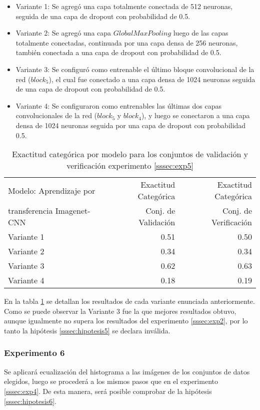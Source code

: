 \begin{itemize}
	\item Variante 1: Se agregó una capa totalmente conectada de 512 neuronas, seguida de una capa de dropout con probabilidad de 0.5.
	\item Variante 2: Se agregó una capa \(GlobalMaxPooling\) luego de las capas totalmente conectadas, continuada por una capa densa de 256 neuronas, también conectada a una capa de dropout con probabilidad de 0.5.
	\item Variante 3: Se configuró como entrenable el último bloque convolucional de la red (\(block_5\)), el cual fue conectado a una capa densa de 1024 neuronas seguida de una capa de dropout con probabilidad de 0.5.
	\item Variante 4: Se configuraron como entrenables las últimas dos capas convolucionales de la red (\(block_5\) y \(block_4\)), y luego se conectaron a una capa densa de 1024 neuronas seguida por una capa de dropout con probabilidad 0.5.
\end{itemize}

\begin{table}[h!]
	\centering
	\begin{tabular}{| l | r | r |}
		\toprule
		Modelo: Aprendizaje por & Exactitud Categórica &  Exactitud Categórica \\
		transferencia Imagenet-CNN & Conj. de Validación &  Conj. de Verificación \\
		\midrule
		Variante 1 & 0.51 & 0.50 \\
		\midrule
		Variante 2 & 0.34 & 0.34 \\
		\midrule
		Variante 3 & 0.62 & 0.63 \\
		\midrule
		Variante 4 & 0.18 & 0.19 \\
		\bottomrule
	\end{tabular}
	\caption{Exactitud categórica por modelo para los conjuntos de validación y verificación experimento \ref{sssec:exp5}}
	\label{exp5:results}
\end{table}

En la tabla \ref{exp5:results} se detallan los resultados de cada variante enunciada anteriormente. Como se puede observar la Variante 3 fue la que mejores resultados obtuvo, aunque igualmente no supera los resultados del experimento \ref{sssec:exp2}, por lo tanto la hipótesis \ref{sssec:hipotesis5} se declara inválida.

\subsubsection{Experimento 6} \label{sssec:exp6}
Se aplicará ecualización del histograma a las imágenes de los conjuntos de datos elegidos, luego se procederá a los mismos pasos que en el experimento \ref{sssec:exp4}. De esta manera, será posible comprobar de la hipótesis \ref{sssec:hipotesis6}.

